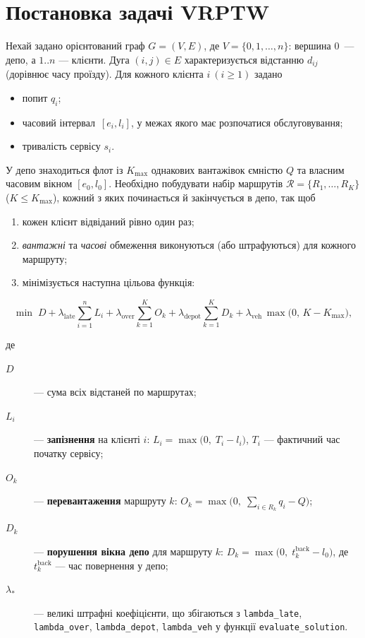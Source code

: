 \documentclass[12pt,a4paper]{article}
\begin{document}
\section{Постановка задачі VRPTW}

Нехай задано орієнтований граф \(G=(V,E)\), де  
\(V=\{0,1,\dots,n\}\): вершина \(0\)~— депо, а \(1..n\) — клієнти.  
Дуга \((i,j)\in E\) характеризується відстанню \(d_{ij}\)  
(дорівнює часу проїзду).  
Для кожного клієнта \(i\ (i\ge 1)\) задано

\begin{itemize}
  \item попит \(q_i\);
  \item часовий інтервал~\([e_i,l_i]\), у межах якого має
        розпочатися обслуговування;
  \item тривалість сервісу \(s_i\).
\end{itemize}

У депо знаходиться флот із \(K_{\max}\) однакових вантажівок
ємністю \(Q\) та власним часовим вікном \([e_0,l_0]\).
Необхідно побудувати набір маршрутів  
\(\mathcal R=\{R_1,\dots,R_K\}\) (\(K\le K_{\max}\)),  
кожний з яких починається й закінчується в депо, так щоб

\begin{enumerate}
  \item кожен клієнт відвіданий рівно один раз;
  \item \emph{вантажні} та \emph{часові} обмеження виконуються
        (або штрафуються) для кожного маршруту;
  \item мінімізується наступна цільова функція:
\end{enumerate}

\[
\min\;
D
+ \lambda_{\text{late}}\sum_{i=1}^{n} L_i
+ \lambda_{\text{over}}\sum_{k=1}^{K} O_k
+ \lambda_{\text{depot}}\sum_{k=1}^{K} D_k
+ \lambda_{\text{veh}}\,
      \max\bigl(0,\,K-K_{\max}\bigr),
\]

де
\begin{description}
  \item[\(D\)] — сума всіх відстаней по маршрутах;
  \item[\(L_i\)] — \textbf{запізнення} на клієнті \(i\):
        \(L_i=\max\bigl(0,\;T_i - l_i\bigr)\),  
        \(T_i\) — фактичний час початку сервісу;
  \item[\(O_k\)] — \textbf{перевантаження} маршруту \(k\):
        \(O_k=\max\bigl(0,\;\sum_{i\in R_k} q_i - Q\bigr)\);
  \item[\(D_k\)] — \textbf{порушення вікна депо} для маршруту \(k\):  
        \(D_k=\max\bigl(0,\;t^{\text{back}}_k - l_0\bigr)\),  
        де \(t^{\text{back}}_k\) — час повернення у депо;
  \item[\(\lambda_{\ast}\)] — великі штрафні коефіцієнти,
        що збігаються з \texttt{lambda\_late}, \texttt{lambda\_over},
        \texttt{lambda\_depot}, \texttt{lambda\_veh}
        у функції \texttt{evaluate\_solution}.
\end{description}
\end{document}

